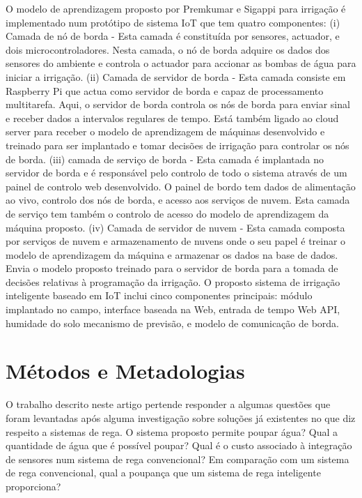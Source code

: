 \documentclass[conference]{IEEEtran}
\begin{document}
O modelo de aprendizagem proposto por Premkumar e Sigappi \cite{premkumar2022iot} para irrigação é implementado num protótipo 
de sistema IoT que tem quatro componentes: (i) Camada de nó de borda - 
Esta camada é constituída por sensores, actuador, e dois microcontroladores. 
Nesta camada, o nó de borda adquire os dados dos sensores do ambiente e controla 
o actuador para accionar as bombas de água para iniciar a irrigação. 
(ii) Camada de servidor de borda - Esta camada consiste em Raspberry Pi que 
actua como servidor de borda e capaz de processamento multitarefa. Aqui, o 
servidor de borda controla os nós de borda para enviar sinal e receber dados 
a intervalos regulares de tempo. Está também ligado ao cloud server para receber 
o modelo de aprendizagem de máquinas desenvolvido e treinado para ser implantado 
e tomar decisões de irrigação para controlar os nós de borda. 
(iii) camada de serviço de borda - Esta camada é implantada no servidor de 
borda e é responsável pelo controlo de todo o sistema através de um painel de 
controlo web desenvolvido. O painel de bordo tem dados de alimentação ao vivo, 
controlo dos nós de borda, e acesso aos serviços de nuvem. Esta camada de 
serviço tem também o controlo de acesso do modelo de aprendizagem da máquina 
proposto. (iv) Camada de servidor de nuvem - Esta camada composta por serviços 
de nuvem e armazenamento de nuvens onde o seu papel é treinar o modelo de 
aprendizagem da máquina e armazenar os dados na base de dados. Envia o modelo 
proposto treinado para o servidor de borda para a tomada de decisões relativas 
à programação da irrigação. O proposto sistema de irrigação inteligente baseado 
em IoT inclui cinco componentes principais: módulo implantado no campo, 
interface baseada na Web, entrada de tempo Web API, humidade do solo 
mecanismo de previsão, e modelo de comunicação de borda.


\section{Métodos e Metadologias}

O trabalho descrito neste artigo pertende responder a algumas questões que foram 
levantadas após alguma investigação sobre soluções já existentes no que diz respeito 
a sistemas de rega. O sistema proposto permite poupar água? Qual a quantidade de água 
que é possível poupar?  Qual é o custo associado à integração de sensores num sistema 
de rega convencional? Em comparação com um sistema de rega convencional, 
qual a poupança que um sistema de rega inteligente proporciona?
\end{document}
